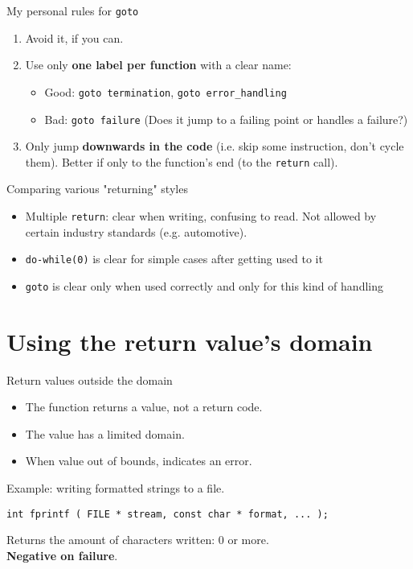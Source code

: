 \documentclass[aspectratio=169,14pt]{beamer}
\begin{document}
\begin{frame}{My personal rules for \texttt{goto}}
\begin{enumerate}
    \item Avoid it, if you can.
    \item Use only \textbf{one label per function} with a clear name:\\
        \begin{itemize}
            \item Good: \texttt{goto termination}, \texttt{goto error\_handling}
            \item Bad: \texttt{goto failure}  (Does it jump to a failing point or handles a failure?)
        \end{itemize}
    \item Only jump \textbf{downwards in the code} (i.e. skip some instruction, don’t cycle them). Better if only to the function's end (to the \texttt{return} call).
\end{enumerate}
\end{frame}



\begin{frame}{Comparing various "returning" styles}
\begin{itemize}
    \item Multiple \texttt{return}: clear when writing, confusing to read. Not allowed by certain industry standards (e.g. automotive).
    \item \texttt{do-while(0)} is clear for simple cases after getting used to it
    \item \texttt{goto} is clear only when used correctly and only for this kind of handling
\end{itemize}
\end{frame}



\section{Using the return value's domain}

\begin{frame}[fragile]{Return values outside the domain}

\begin{itemize}
    \item The function returns a value, not a return code.
    \item The value has a limited domain.
    \item When value out of bounds, indicates an error.
\end{itemize}

Example: writing formatted strings to a file.

\begin{lstlisting}[style=cstyle]
int fprintf ( FILE * stream, const char * format, ... );
\end{lstlisting}

Returns the amount of characters written: 0 or more.\\
\textbf{Negative on failure}. 
\end{frame}
\end{document}
